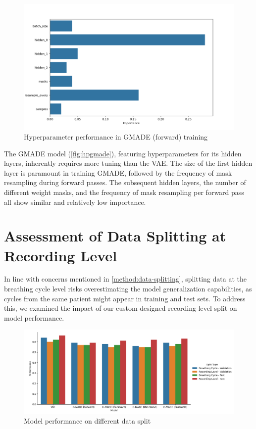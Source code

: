 \begin{figure}[h!]
    \includegraphics[width=\linewidth]{images/importances_gmade}
    \caption{
    Hyperparameter performance in GMADE (forward) training
}
\label{fig:hpgmade}
\end{figure}

The GMADE model (\autoref{fig:hpgmade}), featuring hyperparameters for its hidden layers, inherently requires more tuning than the VAE. The size of the first hidden layer is paramount in training GMADE, followed by the frequency of mask resampling during forward passes. The subsequent hidden layers, the number of different weight masks, and the frequency of mask resampling per forward pass all show similar and relatively low importance.

\section{Assessment of Data Splitting at Recording Level}
In line with concerns mentioned in \autoref{method:data-splitting}, splitting data at the breathing cycle level risks overestimating the model generalization capabilities, as cycles from the same patient might appear in training and test sets. To address this, we examined the impact of our custom-designed recording level split on model performance.

\begin{figure}[h!]
    \includegraphics[width=\linewidth]{images/split_performance}
    \caption{
    Model performance on different data split
}
\label{fig:splitperf}
\end{figure}

